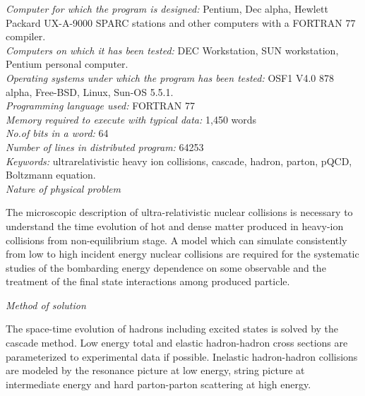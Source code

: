 \documentclass[]{article}
\begin{document}
{\noindent\em Computer for which the program is designed:}
 Pentium, Dec alpha, Hewlett Packard UX-A-9000  SPARC stations
and other computers with a FORTRAN 77 compiler.\\


{\noindent\em Computers on which it has been tested:}
  DEC Workstation,  SUN workstation, Pentium personal computer.\\

{\noindent\em Operating systems under which the program has been tested:}
OSF1 V4.0 878 alpha, Free-BSD, Linux, Sun-OS 5.5.1.\\

{\noindent\em Programming language used:} FORTRAN 77\\

{\noindent\em Memory required to execute with typical data:} 1,450 words\\ 

{\noindent\em No.of bits in a word:} 64\\

{\noindent\em Number of lines in distributed program:} 64253\\

{\noindent\em Keywords:} ultrarelativistic heavy ion collisions,
cascade, hadron, parton, pQCD, Boltzmann equation. \\


{\noindent\em Nature of physical problem}

\noindent
The microscopic description of ultra-relativistic nuclear collisions
is necessary to understand the time evolution of 
hot and dense matter produced in heavy-ion collisions
 from non-equilibrium stage.
A model which can simulate consistently 
 from low to high incident energy nuclear collisions
 are required for the
systematic studies of the bombarding energy dependence on some observable
and the treatment of the final state interactions among produced particle.

\bigskip

{\noindent\em Method of solution}

\noindent
 The space-time evolution of hadrons including 
 excited states
is solved by the cascade method.
Low energy total and elastic hadron-hadron cross sections
 are parameterized to experimental data if possible.
Inelastic hadron-hadron collisions are modeled by the resonance
picture at low energy,
string picture at intermediate energy
and hard parton-parton scattering at high energy.

\bigskip
\end{document}
